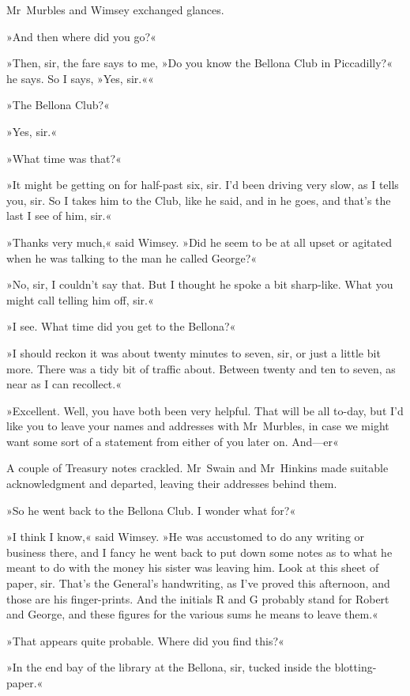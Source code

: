 Mr~Murbles and Wimsey exchanged glances.

»And then where did you go?«

»Then, sir, the fare says to me, »Do you know the Bellona Club in Piccadilly?« he says. So I says, »Yes, sir.««

»The Bellona Club?«

»Yes, sir.«

»What time was that?«

»It might be getting on for half-past six, sir. I'd been driving very slow, as I tells you, sir. So I takes him to the Club, like he said, and in he goes, and that's the last I see of him, sir.«

»Thanks very much,« said Wimsey. »Did he seem to be at all upset or agitated when he was talking to the man he called George?«

»No, sir, I couldn't say that. But I thought he spoke a bit sharp-like. What you might call telling him off, sir.«

»I see. What time did you get to the Bellona?«

»I should reckon it was about twenty minutes to seven, sir, or just a little bit more. There was a tidy bit of traffic about. Between twenty and ten to seven, as near as I can recollect.«

»Excellent. Well, you have both been very helpful. That will be all to-day, but I'd like you to leave your names and addresses with Mr~Murbles, in case we might want some sort of a statement from either of you later on. And—er\longdash«

A couple of Treasury notes crackled. Mr~Swain and Mr~Hinkins made suitable acknowledgment and departed, leaving their addresses behind them.

»So he went back to the Bellona Club. I wonder what for?«

»I think I know,« said Wimsey. »He was accustomed to do any writing or business there, and I fancy he went back to put down some notes as to what he meant to do with the money his sister was leaving him. Look at this sheet of paper, sir. That's the General's handwriting, as I've proved this afternoon, and those are his finger-prints. And the initials R and G probably stand for Robert and George, and these figures for the various sums he means to leave them.«

»That appears quite probable. Where did you find this?«

»In the end bay of the library at the Bellona, sir, tucked inside the blotting-paper.«

